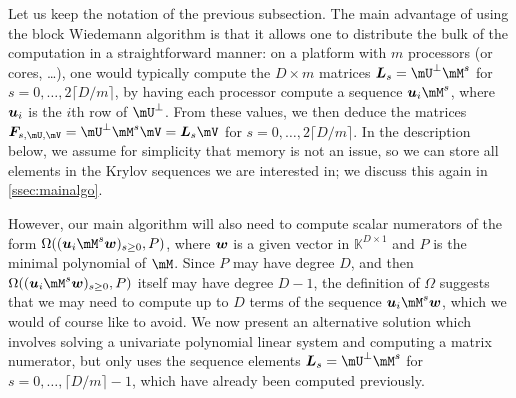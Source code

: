 \documentclass[12pt]{article}
\newcommand{\mat}[1]{\bm{\MakeUppercase{#1}}} %
\newcommand{\row}[1]{\bm{\MakeLowercase{#1}}} %
\newcommand{\col}[1]{\bm{\MakeLowercase{#1}}} %
\newcommand{\seqelt}[1]{\bm{F}_{#1}} %
\newcommand{\minpoly}{P}
\def\K{\mathbb{K}}
\def\K {\ensuremath{\mathbb{K}}}
\begin{document}
Let us keep the notation of the previous subsection.  The main
advantage of using the block Wiedemann algorithm is that it allows one to
distribute the bulk of the computation in a straightforward manner: on
a platform with $m$ processors (or cores, \dots), one would typically
compute the $D \times m$ matrices $\mat{L}_s=\mU^\perp\mM^s$ for
$s=0,\dots,2\lceil D/m \rceil$, by having each processor compute a
sequence $\row{u}_i \mM^s$, where $\row{u}_i$ is the $i$th row of
$\mU^\perp$. From these values, we then deduce the matrices
$\seqelt{s,\mU,\mV}=\mU^\perp \mM^s \mV = \mat{L}_s\mV$ for
$s=0,\dots,2\lceil D/m \rceil$. In the description below, we assume
for simplicity that memory is not an issue, so we can store all
elements in the Krylov sequences we are interested in; we discuss this 
again in \cref{ssec:mainalgo}.

However, our main algorithm will also need to compute scalar numerators of
the form \sloppy $\Omega((\row{u}_i \mM^s \col{w})_{s \ge 0},
\minpoly)$, where $\row{w}$ is a given vector in $\K^{D \times 1}$ and
$\minpoly$ is the minimal polynomial of $\mM$. Since $\minpoly$ may
have degree $D$, and then $\Omega((\row{u}_i \mM^s \col{w})_{s \ge 0},
\minpoly)$ itself may have degree $D-1$,
the definition of $\Omega$ suggests that we
may need to compute up to $D$ terms of the sequence $\row{u}_i \mM^s
\col{w}$, which we would of course like to avoid. We now present an
alternative solution which involves solving a univariate polynomial linear system
and computing a matrix numerator, but only uses the sequence elements
$\mat{L}_s= \mU^\perp \mM^s$ for $s=0,\dots,\lceil D/m \rceil-1$,
which have already been computed previously.
\end{document}
